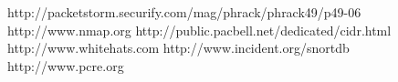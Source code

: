 \documentclass[english]{report}
\begin{document}
\appendix

\begin{thebibliography}{99}
http://packetstorm.securify.com/mag/phrack/phrack49/p49-06
http://www.nmap.org
http://public.pacbell.net/dedicated/cidr.html
http://www.whitehats.com
http://www.incident.org/snortdb
http://www.pcre.org
\end{thebibliography}
\end{document}
